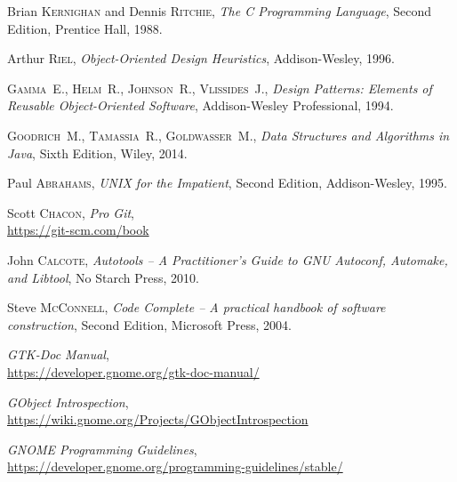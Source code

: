 \begin{thebibliography}{10}

Brian \textsc{Kernighan} and Dennis \textsc{Ritchie},
\emph{The C Programming Language},
Second Edition, Prentice Hall, 1988.

\medskip
{}
Arthur \textsc{Riel},
\emph{Object-Oriented Design Heuristics},
Addison-Wesley, 1996.

\medskip
{}
\textsc{Gamma}~E., \textsc{Helm}~R., \textsc{Johnson}~R., \textsc{Vlissides}~J.,
\emph{Design Patterns: Elements of Reusable Object-Oriented Software},
Addison-Wesley Professional, 1994.

\medskip
{}
\textsc{Goodrich}~M., \textsc{Tamassia}~R., \textsc{Goldwasser}~M.,
\emph{Data Structures and Algorithms in Java},
Sixth Edition, Wiley, 2014.

\medskip
{}
Paul \textsc{Abrahams},
\emph{UNIX for the Impatient},
Second Edition, Addison-Wesley, 1995.

\medskip
{}
Scott \textsc{Chacon},
\emph{Pro Git},\\
\url{https://git-scm.com/book}

\medskip
{}
John \textsc{Calcote},
\emph{Autotools -- A Practitioner's Guide to GNU Autoconf, Automake, and Libtool},
No Starch Press, 2010.

\medskip
{}
Steve \textsc{McConnell},
\emph{Code Complete -- A practical handbook of software construction},
Second Edition, Microsoft Press, 2004.

\medskip
{}
\emph{GTK-Doc Manual},\\
\url{https://developer.gnome.org/gtk-doc-manual/}

\medskip
{}
\emph{GObject Introspection},\\
\url{https://wiki.gnome.org/Projects/GObjectIntrospection}

\medskip
{}
\emph{GNOME Programming Guidelines},\\
\url{https://developer.gnome.org/programming-guidelines/stable/}

\end{thebibliography}
